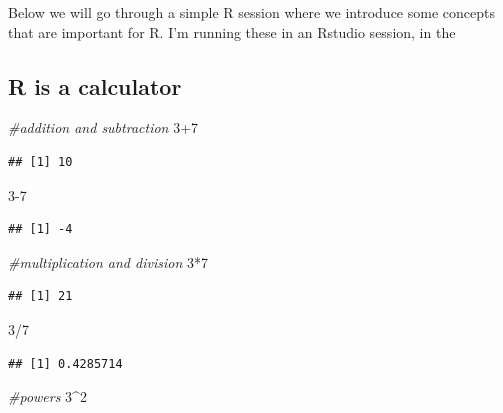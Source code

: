 \documentclass[
]{book}
\newenvironment{Shaded}{\begin{snugshade}}{\end{snugshade}}
\newcommand{\CommentTok}[1]{\textcolor[rgb]{0.56,0.35,0.01}{\textit{#1}}}
\newcommand{\DecValTok}[1]{\textcolor[rgb]{0.00,0.00,0.81}{#1}}
\newcommand{\SpecialCharTok}[1]{\textcolor[rgb]{0.00,0.00,0.00}{#1}}
\begin{document}
Below we will go through a simple R session where we introduce some
concepts that are important for R. I'm running these in an Rstudio
session, in the

\hypertarget{r-is-a-calculator}{%
\subsection{R is a calculator}\label{r-is-a-calculator}}

\begin{Shaded}
\begin{Highlighting}[]
\CommentTok{\#addition and subtraction}
\DecValTok{3}\SpecialCharTok{+}\DecValTok{7}
\end{Highlighting}
\end{Shaded}

\begin{verbatim}
## [1] 10
\end{verbatim}

\begin{Shaded}
\begin{Highlighting}[]
\DecValTok{3{-}7}
\end{Highlighting}
\end{Shaded}

\begin{verbatim}
## [1] -4
\end{verbatim}

\begin{Shaded}
\begin{Highlighting}[]
\CommentTok{\#multiplication and division}
\DecValTok{3}\SpecialCharTok{*}\DecValTok{7}
\end{Highlighting}
\end{Shaded}

\begin{verbatim}
## [1] 21
\end{verbatim}

\begin{Shaded}
\begin{Highlighting}[]
\DecValTok{3}\SpecialCharTok{/}\DecValTok{7}
\end{Highlighting}
\end{Shaded}

\begin{verbatim}
## [1] 0.4285714
\end{verbatim}

\begin{Shaded}
\begin{Highlighting}[]
\CommentTok{\#powers}
\DecValTok{3}\SpecialCharTok{\^{}}\DecValTok{2}
\end{Highlighting}
\end{Shaded}
\end{document}
